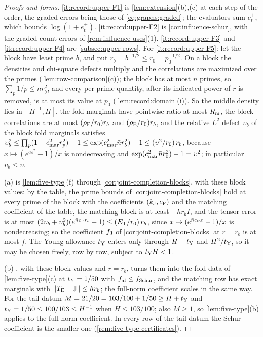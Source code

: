 \begin{proof}[Proofs and forms]
\ref{it:record:upper-F1} is \cref{lem:extension}(b),(c) at each step of the order, the
graded errors being those of \eqref{eq:graphs:graded}; the evaluators sum $e^+_t$,
which bounds $\log(1+e^+_t)$. \ref{it:record:upper-F2} is \cref{cor:influence-schur},
with the graded count errors of \cref{rem:influence-uses}(1).
\ref{it:record:upper-F3} and \ref{it:record:upper-F4} are
\cref{subsec:upper-rows}. For \ref{it:record:upper-F5}: let the block have least prime
$b$, and put $r_b=b^{-1/2}\le r_0=p_0^{-1/2}$. On a block the densities and chi-square
defects multiply and the correlations are maximized over the primes
(\cref{lem:row-comparison}(c)); the block has at most $\bar n$ primes, so
$\sum_p1/p\le\bar nr_b^2$, and every per-prime quantity, after its indicated power of $r$
is removed, is at most its value at $p_0$ (\cref{lem:record:domain}(i)). So the middle
density lies in $[H^{-1},H]$, the fold marginals have pointwise ratio at most $R_{\rm m}$,
the block correlations are at most $(\rho_{\rm F}/r_0)r_b$ and $(\rho_{\rm E}/r_0)r_b$,
and the relative $L^2$ defect $\upsilon_b$ of the block fold marginals satisfies
$\upsilon_b^2\le\prod_p(1+c_{\rm mar}^2r_p^2)-1\le\exp(c_{\rm mar}^2\bar nr_b^2)-1\le
(\upsilon^2/r_0)\,r_b$, because $x\mapsto(e^{cx^2}-1)/x$ is nondecreasing and
$\exp(c_{\rm mar}^2\bar nr_0^2)-1=\upsilon^2$; in particular $\upsilon_b\le\upsilon$.

(a) is \cref{lem:five-type}(f) through \cref{cor:joint-completion-blocks}, with these
block values: by the table, the prime bounds of \cref{cor:joint-completion-blocks} hold
at every prime of the block with the coefficients $(k_{\rm J},c_{\rm F})$ and the
matching coefficient of the table, the matching block is at least $-hr_bI$, and the
tensor error is at most $(2\upsilon_b+\upsilon_b^2)(e^{\bar nc_{\rm F}r_b}-1)\le
(E_{\rm T}/r_0)\,r_b$, since $x\mapsto(e^{\bar nc_{\rm F}x}-1)/x$ is nondecreasing; so
the coefficient $f_{\rm J}$ of \cref{cor:joint-completion-blocks} at $r=r_b$ is at most
$f$. The Young allowance $t_{\rm Y}$ enters only through $H+t_{\rm Y}$ and
$H^2/t_{\rm Y}$, so it may be chosen freely, row by row, subject to $t_{\rm Y}H<1$.

(b) , with these block values and $r=r_b$, turns them
into the fold data of \cref{lem:five-type}(c) at $t_{\rm Y}=1/50$ with
$f_{\rm al}\le f_{\rm Schur}$, and the matching row has exact marginals with
$\norm{T_{\rm E}-\Jproj}\le hr_b$; the full-norm coefficient scales in the same way.
For the tail datum $M=\frac{21}{20}=\frac{103}{100}+\frac1{50}\ge H+t_{\rm Y}$ and
$t_{\rm Y}=\frac1{50}\le\frac{100}{103}\le H^{-1}$ when $H\le103/100$; also $M\ge1$, so
\cref{lem:five-type}(b) applies to the full-norm coefficient. In every row of the tail
datum the Schur coefficient is the smaller one (\cref{rem:five-type-certificates}).


\end{proof}

